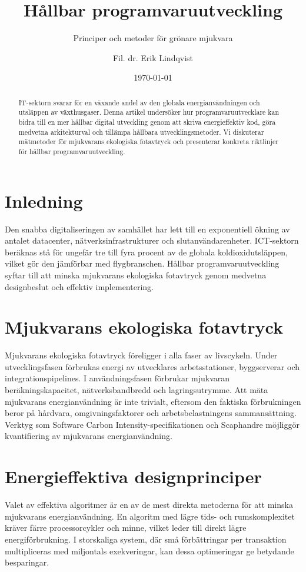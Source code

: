 \documentclass[
    language=swedish,
    doctype=article,
]{../../omnilatex}
\title{Hållbar programvaruutveckling}
\subtitle{Principer och metoder för grönare mjukvara}
\author{Fil. dr. Erik Lindqvist}
\date{\today}
\begin{document}
\maketitle

\begin{abstract}
IT-sektorn svarar för en växande andel av den globala energianvändningen och utsläppen av växthusgaser. Denna artikel undersöker hur programvaruutvecklare kan bidra till en mer hållbar digital utveckling genom att skriva energieffektiv kod, göra medvetna arkitekturval och tillämpa hållbara utvecklingsmetoder. Vi diskuterar mätmetoder för mjukvarans ekologiska fotavtryck och presenterar konkreta riktlinjer för hållbar programvaruutveckling.
\end{abstract}

\section{Inledning}
Den snabba digitaliseringen av samhället har lett till en exponentiell ökning av antalet datacenter, nätverksinfrastrukturer och slutanvändarenheter. ICT-sektorn beräknas stå för ungefär tre till fyra procent av de globala koldioxidutsläppen, vilket gör den jämförbar med flygbranschen. Hållbar programvaruutveckling syftar till att minska mjukvarans ekologiska fotavtryck genom medvetna designbeslut och effektiv implementering.

\section{Mjukvarans ekologiska fotavtryck}
Mjukvarans ekologiska fotavtryck föreligger i alla faser av livscykeln. Under utvecklingsfasen förbrukas energi av utvecklares arbetsstationer, byggserverar och integrationspipelines. I användningsfasen förbrukar mjukvaran beräkningskapacitet, nätverksbandbredd och lagringsutrymme. Att mäta mjukvarans energianvändning är inte trivialt, eftersom den faktiska förbrukningen beror på hårdvara, omgivningsfaktorer och arbetsbelastningens sammansättning. Verktyg som Software Carbon Intensity-specifikationen och Scaphandre möjliggör kvantifiering av mjukvarans energianvändning.

\section{Energieffektiva designprinciper}
Valet av effektiva algoritmer är en av de mest direkta metoderna för att minska mjukvarans energianvändning. En algoritm med lägre tids- och rumskomplexitet kräver färre processorcykler och minne, vilket leder till direkt lägre energiförbrukning. I storskaliga system, där små förbättringar per transaktion multipliceras med miljontals exekveringar, kan dessa optimeringar ge betydande besparingar.
\end{document}
